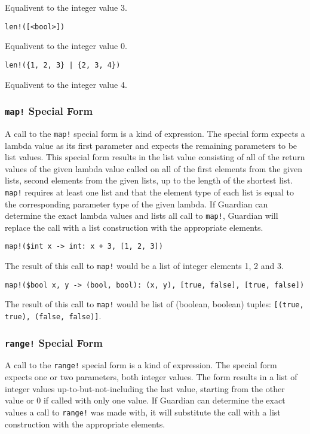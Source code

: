{{\begin{itemize}
{				Equalivent to the integer value 3.
			
			\item \texttt{len!([<bool>])}
			
				Equalivent to the integer value 0.
			
			\item \texttt{len!(\{1, 2, 3\} | \{2, 3, 4\})}
			
				Equalivent to the integer value 4.
		}
		\end{itemize}
	}
	
	\subsubsection{\texttt{map!} Special Form}
	{
		A call to the \texttt{map!} special form is a kind of expression.
		The special form expects a lambda value as its
		first parameter and expects the remaining parameters to be list values.
		This special form results in the list value consisting
		of all of the return values of the given lambda value called on all of the
		first elements from the given lists, second elements from the given
		lists, up to the length of the shortest list.
		\texttt{map!} requires at least one list and that
		the element type of each list is equal to the corresponding parameter type
		of the given lambda.
		If Guardian can determine the exact lambda values and lists all call to
		\texttt{map!}, Guardian will replace the call with a list
		construction with the appropriate elements.
		
		\begin{itemize}
		{
			\item \texttt{map!(\$int x -> int: x + 3, [1, 2, 3])}
			
				The result of this call to \texttt{map!} would be a list of
				integer elements 1, 2 and 3.
			
			\item \texttt{map!(\$bool x, y -> (bool, bool): (x, y), [true, false], [true, false])}
			
				The result of this call to \texttt{map!} would be list of
				(boolean, boolean) tuples: \texttt{[(true, true), (false, false)]}.
		}
		\end{itemize}
	}
	
	\subsubsection{\texttt{range!} Special Form}
	{
		A call to the \texttt{range!} special form is a kind of expression.
		The special form expects one or two parameters, both integer values.
		The form results in a list of integer values up-to-but-not-including
		the last value, starting from the other value or 0 if called with only
		one value.
		If Guardian can determine the exact values a call to \texttt{range!}
		was made with, it will substitute the call with a list construction
		with the appropriate elements.
		
}}
